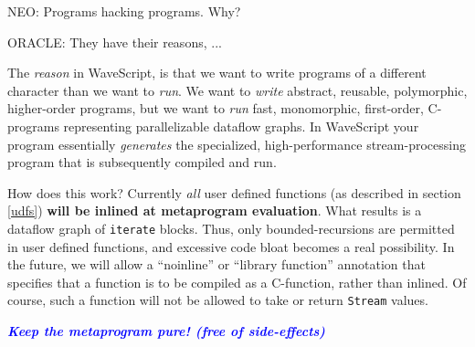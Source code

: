 \documentclass[twocolumn]{report}
\newcommand{\rednote}[1]{{\textcolor{blue}{#1}}}
\begin{document}
\begin{center}
NEO: Programs hacking programs. Why?

ORACLE: They have their reasons, ...
\end{center}

The {\em reason} in WaveScript, is that we want to write programs of a
different character than we want to {\em run}.
We want to {\em write}
abstract, reusable, polymorphic, higher-order programs, but we want to
{\em run} fast, monomorphic, first-order, C-programs representing
parallelizable dataflow graphs.
In WaveScript your program essentially {\em
generates} the specialized, high-performance stream-processing
program that is subsequently compiled and run.  


How does this work?  Currently {\em all} user defined functions (as
described in section \ref{udfs}) {\bf will be inlined at metaprogram
evaluation}.  What results is a dataflow graph of {\tt iterate} blocks.
Thus, only bounded-recursions are permitted in user defined functions,
and excessive code bloat becomes a real possibility.  In the future, we will
allow a ``noinline'' or ``library function'' annotation that specifies
that a function is to be compiled as a C-function, rather than
inlined.  Of course, such a function will not be allowed to take or
return {\tt Stream} values.

\rednote{\em \bf Keep the metaprogram pure! (free of side-effects)}
\end{document}
